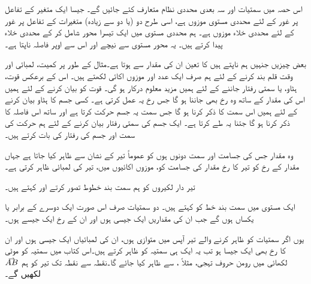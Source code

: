 اس حصہ میں سمتیات اور سہ بعدی محددی نظام متعارف کئے جائیں گے۔ جیسا ایک متغیر کے تفاعل پر غور کے لئے محددی مستوی موزوں ہے، اسی طرح دو (یا دو سے زیادہ) متغیرات کے تفاعل پر غور کے لئے محددی خلاء موزوں ہے۔ ہم محددی مستوی میں ایک تیسرا محور شامل کر کے محددی خلاء پیدا کرتے ہیں۔ یہ محور  مستوی سے نیچے اور اس سے اوپر فاصلہ ناپتا ہے۔

بعض چیزیں جنہیں ہم ناپتے ہیں کا تعین ان کی مقدار سے ہوتا ہے۔مثال کے طور پر کمیت، لمبائی اور وقت قلم بند کرنے کے لئے  ہم صرف ایک عدد اور موزوں اکائی لکھتے ہیں۔ اس کے برعکس قوت، ہٹاو، یا سمتی رفتار جاننے کے لئے ہمیں مزید معلوم درکار ہو گی۔ قوت کو بیان کرنے کے لئے ہمیں اس کی مقدار کے ساتھ وہ رخ بھی جاننا ہو گا جس رخ یہ عمل کرتی ہے۔ کسی جسم کا ہٹاو بیان کرنے کے لئے ہمیں اس سمت کا ذکر کرنا ہو گا جس سمت یہ جسم حرکت کرتا ہے اور ساتھ اس فاصلہ کا ذکر کرنا ہو گا جتنا یہ طے کرتا ہے۔ ایک جسم کی سمتی رفتار بیان کرنے کے لئے ہم حرکت کی سمت اور جسم کی رفتار کی بات کرتے ہیں۔

وہ مقدار جس کی جسامت اور سمت دونوں ہوں کو عموماً تیر کے نشان سے ظاہر کیا جاتا ہے جہاں مقدار کے رخ کو  تیر کا رخ  مقدار  کی جسامت کو، موزوں اکائیوں میں، تیر کی لمبائی ظاہر کرتی ہے۔

تیر دار لکیروں کو ہم سمت بند خطوط تصور کرتے اور  کہتے ہیں۔

ایک مستوی میں سمت بند خط کو  کہتے ہیں۔ دو سمتیات صرف اس صورت ایک دوسرے کے برابر یا یکساں ہوں گے جب ان کی مقداریں ایک جیسی ہوں اور ان کے رخ ایک جیسے ہوں۔

یوں اگر سمتیات کو ظاہر کرنے والے تیر  آپس میں متوازی ہوں، ان کی لمبائیاں ایک جیسی ہوں اور ان کا رخ بھی ایک جیسا ہو تب یہ ایک ہی  سمتیہ کو ظاہر کرتے ہیں۔اس  کتاب میں سمتیہ کو موٹی لکھائی میں رومن حروف تہجی، مثلاً   ،  سے ظاہر کیا جائے گا۔نقطہ  سے نقطہ  تک تیر کو ہم 
$\krightharpoonup{AB}$
 لکھیں گے۔

